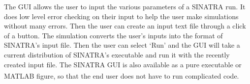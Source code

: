 \indent The GUI allows the user to input the various parameters of a SINATRA run. It does low level error checking on their input to help the user make simulations without many errors. Then the user can create an input text file through a click of a button. The simulation converts the user's inputs into the format of SINATRA's input file. Then the user can select `Run' and the GUI will take a current distribution of SINATRA's executable and run it with the recently created input file. The SINATRA GUI is also available as a pure executable or MATLAB\textsuperscript{\textregistered} figure, so that the end user does not have to run complicated code. 



